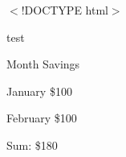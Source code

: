 $<$!DOCTYPE html$>$

 
 
 test
 
 
 
 
 Month
 Savings
 
 
 January
 \$100
 
 
 February
 \$100
 
 
 Sum: \$180
 
 
 

